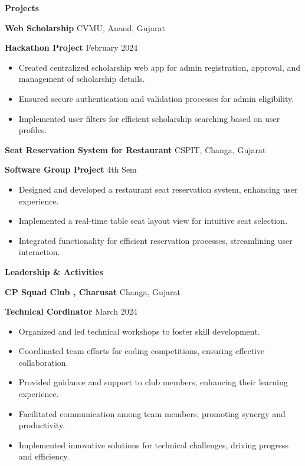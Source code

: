\documentclass[11pt]{article}
\begin{document}
\begin{center}
    \textbf{Projects }
\end{center}

\textbf{Web Scholarship}	\hfill CVMU, Anand, Gujarat

\textbf{Hackathon Project} \hfill February 2024
\begin{itemize}[noitemsep, topsep=0pt, partopsep=0pt, parsep=0pt]
    \item Created centralized scholarship web app for admin registration, approval, and management of scholarship details.
    \item Ensured secure authentication and validation processes for admin eligibility.
    \item Implemented user filters for efficient scholarship searching based on user profiles.
\end{itemize}

\vspace{12pt}

\textbf{Seat Reservation System for Restaurant}	\hfill CSPIT, Changa, Gujarat

\textbf{Software Group Project} \hfill 4th Sem
\begin{itemize}[noitemsep, topsep=0pt, partopsep=0pt, parsep=0pt]
    \item Designed and developed a restaurant seat reservation system, enhancing user experience.
    \item Implemented a real-time table seat layout view for intuitive seat selection.
    \item Integrated functionality for efficient reservation processes, streamlining user interaction.

\end{itemize}

\vspace{12pt}


\begin{center}
    \textbf{Leadership \& Activities}
\end{center}

\textbf{CP Squad Club , Charusat}	\hfill Changa, Gujarat

\textbf{Technical Cordinator} \hfill March 2024
\begin{itemize}[noitemsep, topsep=0pt, partopsep=0pt, parsep=0pt]
   \item Organized and led technical workshops to foster skill development.
    \item Coordinated team efforts for coding competitions, ensuring effective collaboration.
    \item Provided guidance and support to club members, enhancing their learning experience.
    \item Facilitated communication among team members, promoting synergy and productivity.
    \item Implemented innovative solutions for technical challenges, driving progress and efficiency.

\end{itemize}
\end{document}

